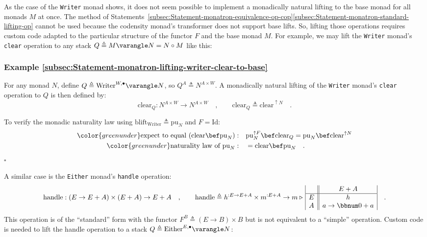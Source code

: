As the case of the \lstinline!Writer! monad shows, it does not seem
possible to implement a monadically natural lifting to the base monad
for all monads $M$ at once. The method of Statements~\ref{subsec:Statement-monatron-equivalence-op-cop}\textendash \ref{subsec:Statement-monatron-standard-lifting-op}
cannot be used because the codensity monad\textsf{'}s transformer does not
support base lifts. So, lifting those operations requires custom code
adapted to the particular structure of the functor $F$ and the base
monad $M$. For example, we may lift the \lstinline!Writer! monad\textsf{'}s
\lstinline!clear! operation to any stack $Q\triangleq M\varangle N=N\circ M$
like this:

\subsubsection{Example \label{subsec:Statement-monatron-lifting-writer-clear-to-base}\ref{subsec:Statement-monatron-lifting-writer-clear-to-base}}

For any monad $N$, define $Q\triangleq\text{Writer}^{W,\bullet}\varangle N$,
so $Q^{A}\triangleq N^{A\times W}$. A monadically natural lifting
of the \lstinline!Writer! monad\textsf{'}s \lstinline!clear! operation to
$Q$ is then defined by:
\[
\text{clear}_{Q}:N^{A\times W}\rightarrow N^{A\times W}\quad,\quad\quad\text{clear}_{Q}\triangleq\text{clear}^{\uparrow N}\quad.
\]

To verify the monadic naturality law using $\text{blift}_{\text{Writer}}\triangleq\text{pu}_{N}$
and $F=\text{Id}$:
\begin{align*}
{\color{greenunder}\text{expect to equal }(\text{clear}\bef\text{pu}_{N}):}\quad & \text{pu}_{N}^{\uparrow F}\bef\text{clear}_{Q}=\text{pu}_{N}\bef\text{clear}^{\uparrow N}\\
{\color{greenunder}\text{naturality law of }\text{pu}_{N}:}\quad & =\text{clear}\bef\text{pu}_{N}\quad.
\end{align*}
$\square$

A similar case is the \lstinline!Either! monad\textsf{'}s \lstinline!handle!
operation:
\[
\text{handle}:\left(E\rightarrow E+A\right)\times\left(E+A\right)\rightarrow E+A\quad,\quad\quad\text{handle}\triangleq h^{:E\rightarrow E+A}\times m^{:E+A}\rightarrow m\triangleright\,\begin{array}{|c||c|}
 & E+A\\
\hline E & h\\
A & a\rightarrow\bbnum 0+a
\end{array}\quad.
\]
This operation is of the \textsf{``}standard\textsf{''} form with the functor $F^{B}\triangleq\left(E\rightarrow B\right)\times B$
but is not equivalent to a \textsf{``}simple\textsf{''} operation. Custom code is
needed to lift the handle operation to a stack $Q\triangleq\text{Either}^{E,\bullet}\varangle N$:

